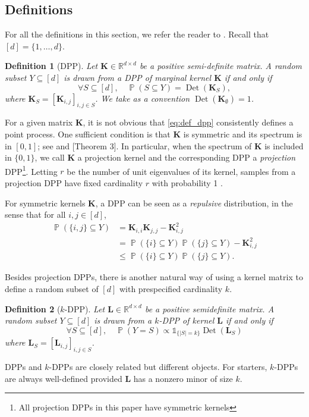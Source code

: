 \documentclass[twoside,11pt]{book}
\newtheorem{definition}{Definition}
\numberwithin{theorem}{chapter}
\numberwithin{definition}{chapter}
\numberwithin{proposition}{chapter}
\numberwithin{corollary}{chapter}
\numberwithin{example}{chapter}
\numberwithin{lemma}{chapter}
\DeclareMathOperator{\Det}{Det}
\DeclareMathOperator{\Prb}{\mathbb{P}}
\begin{document}
\subsection{Definitions}
For all the definitions in this section, we refer the reader to \citep{KuTa12}. Recall that $[d] = \{1,\dots,d\}$.%
\begin{definition}[DPP]
Let $\bm{K} \in \mathbb{R}^{d\times d}$ be a positive semi-definite matrix.
A random subset $Y \subseteq [d]$ is drawn from a DPP of marginal kernel $\bm{K}$ if and only if
\begin{equation}\label{eq:def_dpp}
\forall S \subseteq [d],\quad \Prb(S \subseteq Y) = \Det(\bm{K}_{S}),
\end{equation}
where $\bm{K}_{S} = [\bm{K}_{i,j}]_{i,j \in S}$. We take as a convention $\Det(\bm{K}_{\emptyset}) = 1$.
\end{definition}
For a given matrix $\bm{K}$, it is not obvious that \eqref{eq:def_dpp} consistently defines a point process. One sufficient condition is that $\bm{K}$ is symmetric and its spectrum is in $[0,1]$; see \citep{Mac75} and \citep{Sos00}[Theorem 3]. In particular, when the spectrum of $\bm{K}$ is included in $\{0,1\}$, we call $\bm{K}$ a projection kernel and the corresponding DPP a \emph{projection} DPP\footnote{All projection DPPs in this paper have symmetric kernels}. Letting $r$ be the number of unit eigenvalues of its kernel, samples from a projection DPP have fixed cardinality $r$ with probability 1 \cite*[Lemma 17]{HoKrPeVi06}.

For symmetric kernels $\bm{K}$, a DPP can be seen as a \emph{repulsive} distribution, in the sense that for all $i,j\in [d]$,
\begin{align}
  \Prb(\{i,j\} \subseteq Y) &= \bm{K}_{i,i} \bm{K}_{j,j} - \bm{K}^2_{i,j}\\
  &= \Prb(\{i\} \subseteq Y)\Prb(\{j\} \subseteq Y) - \bm{K}^2_{i,j}\\
  &\leq \Prb(\{i\} \subseteq Y)\Prb(\{j\} \subseteq Y).
\end{align}

Besides projection DPPs, there is another natural way of using a kernel matrix to define a random subset of $[d]$ with prespecified cardinality $k$.
\begin{definition}[$k$-DPP]\label{def:kDPP}
Let $\bm{L} \in \mathbb{R}^{d\times d}$ be a positive semidefinite matrix.
A random subset $Y \subseteq [d]$ is drawn from a $k$-DPP of kernel $\bm{L}$ if and only if
\begin{equation}\label{eq:def_kdpp}
\forall S \subseteq [d],\quad \Prb(Y = S) \propto \mathbb{1}_{\{\vert S\vert = k\}}\Det(\bm{L}_{S})
\end{equation}
where $\bm{L}_{S} = [\bm{L}_{i,j}]_{i,j \in S}$.
\end{definition}
DPPs and $k$-DPPs are closely related but different objects. For starters, $k$-DPPs are always well-defined provided $\bm{L}$ has a nonzero minor of size $k$.
\end{document}
